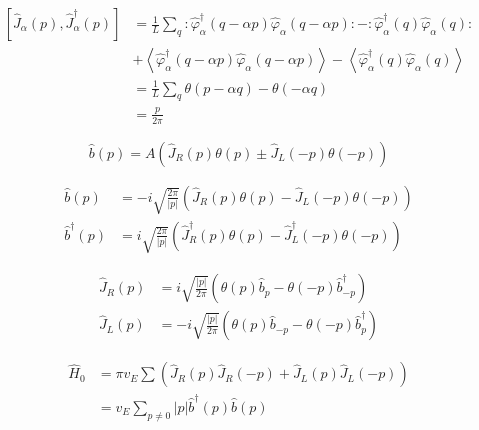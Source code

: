 \begin{align*}
{\left[\hat{J}_{\alpha}(p), \hat{J}_{\alpha}^{\dagger}(p)\right] } & =\frac{1}{L} \sum_{q}: \hat{\varphi}_{\alpha}^{\dagger}(q-\alpha p) \hat{\varphi}_{\alpha}(q-\alpha p):-: \hat{\varphi}_{\alpha}^{\dagger}(q) \hat{\varphi}_{\alpha}(q):  \tag{2.30}\\
& +\left\langle\hat{\varphi}_{\alpha}^{\dagger}(q-\alpha p) \hat{\varphi}_{\alpha}(q-\alpha p)\right\rangle-\left\langle\hat{\varphi}_{\alpha}^{\dagger}(q) \hat{\varphi}_{\alpha}(q)\right\rangle \\
& =\frac{1}{L} \sum_{q} \theta(p-\alpha q)-\theta(-\alpha q) \\
& =\frac{p}{2 \pi}
\end{align*}



\begin{equation*}
\hat{b}(p)=A\left(\hat{J}_{R}(p) \theta(p) \pm \hat{J}_{L}(-p) \theta(-p)\right) \tag{2.31}
\end{equation*}



\begin{align*}
\hat{b}(p) & =-i \sqrt{\frac{2 \pi}{|p|}}\left(\hat{J}_{R}(p) \theta(p)-\hat{J}_{L}(-p) \theta(-p)\right)  \tag{2.32}\\
\hat{b}^{\dagger}(p) & =i \sqrt{\frac{2 \pi}{|p|}}\left(\hat{J}_{R}^{\dagger}(p) \theta(p)-\hat{J}_{L}^{\dagger}(-p) \theta(-p)\right)
\end{align*}


\begin{align*}
\hat{J}_{R}(p) & =i \sqrt{\frac{|p|}{2 \pi}}\left(\theta(p) \hat{b}_{p}-\theta(-p) \hat{b}_{-p}^{\dagger}\right)  \tag{2.33}\\
\hat{J}_{L}(p) & =-i \sqrt{\frac{|p|}{2 \pi}}\left(\theta(p) \hat{b}_{-p}-\theta(-p) \hat{b}_{p}^{\dagger}\right)
\end{align*}


\begin{align*}
\hat{H}_{0} & =\pi v_{E} \sum\left(\hat{J}_{R}(p) \hat{J}_{R}(-p)+\hat{J}_{L}(p) \hat{J}_{L}(-p)\right) \\
& =v_{E} \sum_{p \neq 0}|p| \hat{b}^{\dagger}(p) \hat{b}(p) \tag{2.37}
\end{align*}











